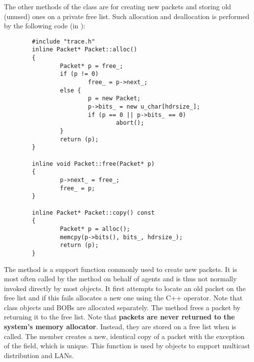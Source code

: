 The other methods of the  class are for creating new
packets and storing old (unused) ones on a private free list.
Such allocation and deallocation is performed by the
following code (in ):
\begin{small}
\begin{verbatim}
        #include "trace.h"
        inline Packet* Packet::alloc()
        {
                Packet* p = free_;
                if (p != 0)
                        free_ = p->next_;
                else {
                        p = new Packet;
                        p->bits_ = new u_char[hdrsize_];
                        if (p == 0 || p->bits_ == 0)
                                abort();
                }
                return (p);
        }

        inline void Packet::free(Packet* p)
        {
                p->next_ = free_;
                free_ = p;
        }

        inline Packet* Packet::copy() const
        {
                Packet* p = alloc();
                memcpy(p->bits(), bits_, hdrsize_);
                return (p);
        }
\end{verbatim}
\end{small}
The  method is a support function commonly
used to create new packets.
It is most often called by the  method on
behalf of agents and is thus not normally invoked directly by most objects.
It first attempts to locate an old packet on the free list and
if this fails allocates a new one using the C++  operator.
Note that  class objects and BOBs are
allocated separately.
The  method frees a packet by returning it to the free
list.
Note that {\bf packets are never returned to the system's memory
allocator}.
Instead, they are stored on a free list when  is called.
The  member creates a new, identical copy of a packet
with the exception of the  field, which is unique.
This function is used by  objects to support
multicast distribution and LANs.

\subsubsection{}

